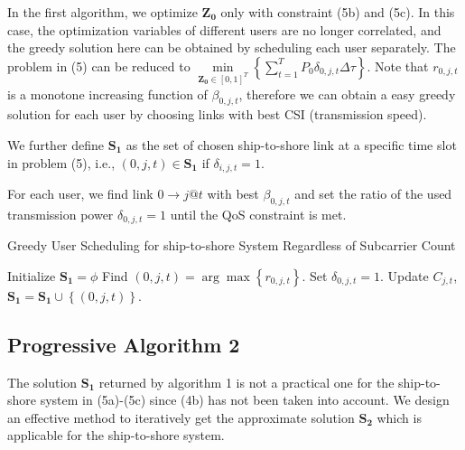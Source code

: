 \documentclass[conference]{IEEEtran}
\begin{document}
In the first algorithm, we optimize ${{\mathbf{Z}}_{\mathbf{0}}}$ only with constraint (5b) and (5c). In this case, the optimization variables of different users are no longer correlated, and the greedy solution here can be obtained by scheduling each user separately. The problem in (5) can be reduced to $\mathop {\min }\limits_{{{\mathbf{Z}}_{\mathbf{0}}} \in {{\left[ {0,1} \right]}^T}} \left\{ {\sum\limits_{t = 1}^T {{P_{0}}\delta _{0,j,t} \Delta \tau } } \right\}$. Note that ${r_{0,j,t}}$ is a monotone increasing function of ${\beta _{0,j,t}}$, therefore we can obtain a easy greedy solution for each user by choosing links with best CSI (transmission speed). 

We further define ${{\mathbf{S}}_{\mathbf{1}}}$ as the set of chosen ship-to-shore link at a specific time slot in problem (5), i.e., $\left( {0,j,t} \right) \in {\mathbf{S}}_{\mathbf{1}}$ if ${\delta _{i,j,t} = 1}$. 

For each user, we find link $0 \to j@t$ with best ${\beta _{0,j,t}}$ and set the ratio of the used transmission power ${\delta _{0,j,t} = 1}$ until the QoS constraint is met.

\begin{algorithm}[h]
\caption{Greedy User Scheduling for ship-to-shore System Regardless of Subcarrier Count}
\begin{algorithmic}[1]
\STATE Initialize ${{\mathbf{S}}_{\mathbf{1}}}=\phi$
    \STATE Find $\left( {0,j,t} \right) = \arg \max \left\{ {r_{0,j,t}} \right\}$.
    \STATE Set ${\delta _{0,j,t}} = 1$.
    \STATE Update ${C_{j,t}}$, ${{\mathbf{S}}_{\mathbf{1}}}={{\mathbf{S}}_{\mathbf{1}}} \cup \left\{ {\left( {0,j,t} \right)} \right\}$.
  \ENDWHILE
\ENDFOR
\end{algorithmic}
\end{algorithm}



\subsection{Progressive Algorithm 2}

The solution ${{\mathbf{S}}_{\mathbf{1}}}$ returned by algorithm 1 is not a practical one for the ship-to-shore system in (5a)-(5c) since (4b) has not been taken into account. We design an effective method to iteratively get the approximate solution ${{\mathbf{S}}_{\mathbf{2}}}$ which is applicable for the ship-to-shore system. 
\end{document}
